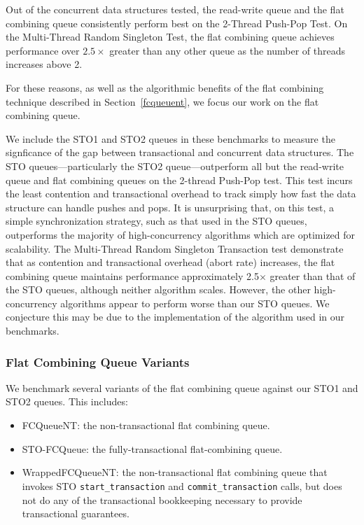 Out of the concurrent data structures tested, the read-write queue\cite{queue1} and the flat combining queue consistently perform best on the 2-Thread Push-Pop Test. On the Multi-Thread Random Singleton Test, the flat combining queue achieves performance over $2.5\times$ greater than any other queue as the number of threads increases above 2.

For these reasons, as well as the algorithmic benefits of the flat combining technique described in Section~\ref{fcqueuent}, we focus our work on the flat combining queue.

We include the STO1 and STO2 queues in these benchmarks to measure the signficance of the gap between transactional and concurrent data structures. The STO queues---particularly the STO2 queue---outperform all but the read-write queue and flat combining queues on the 2-thread Push-Pop test. This test incurs the least contention and transactional overhead to track simply how fast the data structure can handle pushes and pops. It is unsurprising that, on this test, a simple synchronization strategy, such as that used in the STO queues, outperforms the majority of high-concurrency algorithms which are optimized for scalability. The Multi-Thread Random Singleton Transaction test demonstrate that as contention and transactional overhead (abort rate) increases, the flat combining queue maintains performance approximately 2.5$\times$ greater than that of the STO queues, although neither algorithm scales. However, the other high-concurrency algorithms appear to perform worse than our STO queues. We conjecture this may be due to the implementation of the algorithm used in our benchmarks\cite{libcds}.

\subsubsection{Flat Combining Queue Variants}

We benchmark several variants of the flat combining queue against our STO1 and STO2 queues. This includes:
\begin{itemize}
    \item FCQueueNT: the non-transactional flat combining queue.
    \item STO-FCQueue: the fully-transactional flat-combining queue.
    \item WrappedFCQueueNT: the non-transactional flat combining queue that invokes STO \texttt{start\_transaction} and \texttt{commit\_transaction} calls, but does not do any of the transactional bookkeeping necessary to provide transactional guarantees.
\end{itemize}


